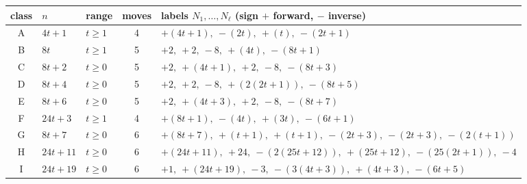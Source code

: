 \begin{tabular}{@{}cllcl@{}}\toprule
class & $n$ & range & moves & labels $N_1,\dots,N_\ell$ (sign $+$ forward, $-$ inverse)\\\midrule
A & $4 t + 1$ & $t\ge 1$ & 4 & $+(4 t + 1),\ -(2 t),\ +(t),\ -(2 t + 1)$ \\
B & $8 t$ & $t\ge 1$ & 5 & $+2,\ +2,\ -8,\ +(4 t),\ -(8 t + 1)$ \\
C & $8 t + 2$ & $t\ge 0$ & 5 & $+2,\ +(4 t + 1),\ +2,\ -8,\ -(8 t + 3)$ \\
D & $8 t + 4$ & $t\ge 0$ & 5 & $+2,\ +2,\ -8,\ +(2 \left(2 t + 1\right)),\ -(8 t + 5)$ \\
E & $8 t + 6$ & $t\ge 0$ & 5 & $+2,\ +(4 t + 3),\ +2,\ -8,\ -(8 t + 7)$ \\
F & $24 t + 3$ & $t\ge 1$ & 4 & $+(8 t + 1),\ -(4 t),\ +(3 t),\ -(6 t + 1)$ \\
G & $8 t + 7$ & $t\ge 0$ & 6 & $+(8 t + 7),\ +(t + 1),\ +(t + 1),\ -(2 t + 3),\ -(2 t + 3),\ -(2 \left(t + 1\right))$ \\
H & $24 t + 11$ & $t\ge 0$ & 6 & $+(24 t + 11),\ +24,\ -(2 \left(25 t + 12\right)),\ +(25 t + 12),\ -(25 \left(2 t + 1\right)),\ -4$ \\
I & $24 t + 19$ & $t\ge 0$ & 6 & $+1,\ +(24 t + 19),\ -3,\ -(3 \left(4 t + 3\right)),\ +(4 t + 3),\ -(6 t + 5)$ \\
\bottomrule\end{tabular}
